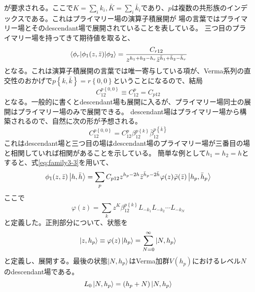 \documentclass[11pt, aps, longbibliography]{article}
\numberwithin{equation}{section}
\begin{document}
        が要求される。ここで$K=\sum_{i}k_i, \bar{K}=\sum_{i}\bar{k}_i$であり、$p$は複数の共形族のインデックスである。これはプライマリー場の演算子積展開が
        場の言葉ではプライマリー場とそのdescendant場で展開されていることを表している。
        三つ目のプライマリー場を持ってきて期待値を取ると、
        \begin{equation}\label{eq:family3-4}
            \matrixel{\phi_r}{\phi_1(z,\bar{z})}{\phi_2} = \frac{C_{r12}}{z^{h_1+h_2-h_r}\bar{z}^{\bar{h}_1+\bar{h}_2-\bar{h}_r}}
        \end{equation}
        となる。これは演算子積展開の言葉では唯一寄与している項が、Verma系列の直交性のおかげで$p\left\{k,\bar{k}\right\}=r\left\{0,0\right\}$ということになるので、結局
        \begin{equation}\label{eq:family3-5}
            C_{12}^{p\left\{0,0\right\}} \equiv C_{12}^p = C_{p12}
        \end{equation}
        となる。一般的に書くとdescendant場も展開に入るが、プライマリー場同士の展開はプライマリー場のみで展開できる。
        descendant場はプライマリー場から構築されるので、自然に次の形が予想される。
        \begin{equation}\label{eq:family3-6}
            C_{12}^{p\left\{0,0\right\}}  = C_{12}^p \beta_{12}^{p\left\{k\right\}}\bar{\beta}_{12}^{p\left\{\bar{k}\right\}}
        \end{equation}
        これはdescendant場と三つ目の場はdescendant場のプライマリー場が三番目の場と相関していれば相関があることを示している。
        簡単な例として$h_1=h_2=h$とすると、式\eqref{eq:family3-3}を用いて、
        \begin{equation}\label{eq:family3-7}
            \phi_1(z,\bar{z}) \ket{h,\bar{h}} = \sum_{p}C_{p12}z^{h_p-2h}\bar{z}^{\bar{h}_p-2\bar{h}}\varphi(z)\bar{\varphi}(\bar{z})\ket{h_p,\bar{h}_p}
        \end{equation}
        ここで
        \begin{equation}\label{eq:family3-8}
            \varphi(z) = \sum_{k}z^K\beta_{12}^{p\left\{k\right\}}L_{-k_1}L_{-k_2}\cdots L_{-k_N}
        \end{equation}
        と定義した。正則部分について、状態を
        \begin{equation}\label{eq:family3-9}
            \ket{z,h_p} \equiv \varphi(z)\ket{h_p} = \sum_{N=0}^{\infty}\ket{N,h_p}
        \end{equation}
        と定義し、展開する。最後の状態$\ket{N,h_p}$はVerma加群$V(h_p)$におけるレベル$N$のdescendant場である。
        \begin{equation}\label{eq:family3-10}
            L_0 \ket{N,h_p} = (h_p+N)\ket{N,h_p}
        \end{equation}
\end{document}
